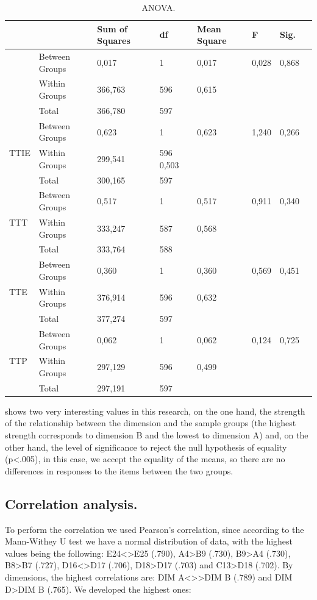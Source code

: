 \documentclass[english]{textolivre}
\begin{document}
\begin{table}[htpb]
\caption{ANOVA.}
\label{tab4}
\centering
\begin{tabular}{p{}lllllll}
\toprule 
& & Sum of Squares & df & Mean Square & F & Sig.
\\
\midrule
\arrayrulecolor[gray]{.7}
\multirow{3}{*}{TT} & Between Groups & 0,017 & 1 & 0,017 & 0,028 & 0,868 \\
& Within Groups & 366,763 & 596 & 0,615 & & \\
& Total & 366,780 & 597 & & & \\
\midrule
\multirow{3}{*}{TTIE} & Between Groups & 0,623 & 1 & 0,623 & 1,240 & 0,266 \\
& Within Groups & 299,541 & 596 0,503 & & \\
& Total & 300,165 & 597 & & & \\
\midrule
\multirow{3}{*}{TTT} & Between Groups & 0,517 & 1 & 0,517 & 0,911 & 0,340 \\
& Within Groups & 333,247 & 587 & 0,568 & & \\
& Total & 333,764 & 588 & & & \\
\midrule
\multirow{3}{*}{TTE} & Between Groups & 0,360 & 1 & 0,360 & 0,569 & 0,451 \\
& Within Groups & 376,914 & 596 & 0,632 & & \\
& Total & 377,274 & 597 & & & \\
\midrule
\multirow{3}{*}{TTP} & Between Groups & 0,062 & 1 & 0,062 & 0,124 & 0,725 \\
& Within Groups & 297,129 & 596 & 0,499 & & \\
& Total & 297,191 & 597 & & & \\
\bottomrule
\end{tabular}
\centering
\end{table}

 shows two very interesting values in this research, on the one hand, the strength of the relationship between the dimension and the sample groups (the highest strength corresponds to dimension B and the lowest to dimension A) and, on the other hand, the level of significance to reject the null hypothesis of equality (p<.005), in this case, we accept the equality of the means, so there are no differences in responses to the items between the two groups.

\subsection{Correlation analysis.}\label{subcorreanaly}
To perform the correlation we used Pearson's correlation, since according to the Mann-Withey U test we have a normal distribution of data, with the highest values being the following: E24<>E25 (.790), A4>B9 (.730), B9>A4 (.730), B8>B7 (.727), D16<>D17 (.706), D18>D17 (.703) and C13>D18 (.702). By dimensions, the highest correlations are: DIM A<>>DIM B (.789) and DIM D>DIM B (.765). We developed the highest ones:
\end{document}
